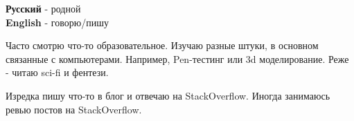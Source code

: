 \begin{minipage}[t]{0.3\textwidth}
	\vspace{-\baselineskip} %


	\textbf{Русский} - родной\\
	\textbf{English} - говорю/пишу\\
\end{minipage}
\hfill
\begin{minipage}[t]{0.3\textwidth}
	\vspace{-\baselineskip} %


	Часто смотрю что-то образовательное. Изучаю разные штуки, в основном связанные с компьютерами. Например, Pen-тестинг или 3d моделирование.
	Реже - читаю sci-fi и фентези.
\end{minipage}
\hfill
\begin{minipage}[t]{0.3\textwidth}
	\vspace{-\baselineskip} %


	Изредка пишу что-то в блог и отвечаю на StackOverflow. Иногда занимаюсь ревью постов на StackOverflow.
\end{minipage}



